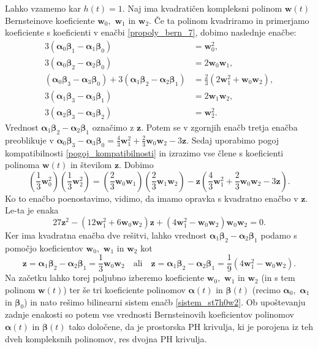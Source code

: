 \documentclass[12pt,a4paper,twoside]{article}
\theoremstyle{definition} %
\theoremstyle{plain} %
\numberwithin{equation}{section}  %
\newcommand{\wV}{\mathbf{w}}
\newcommand{\zV}{\mathbf{z}}
\newcommand{\balpha}{\boldsymbol \alpha}
\newcommand{\bbeta}{\boldsymbol \beta}
\begin{document}
Lahko vzamemo kar $h(t)=1.$ Naj ima kvadratičen kompleksni polinom $\wV(t)$ Bernsteinove koeficiente $\wV_0,$ $\wV_1$ in $\wV_2.$ Če ta polinom kvadriramo in primerjamo koeficiente s koeficienti v enačbi \eqref{propoly_bern_7}, dobimo naslednje enačbe:
\begin{align}
	3(\balpha_0\bbeta_1-\balpha_1\bbeta_0)&=\wV_0^2,\nonumber\\
	3(\balpha_0\bbeta_2-\balpha_2\bbeta_0)&=2\wV_0\wV_1,\nonumber\\
	(\balpha_0\bbeta_3-\balpha_3\bbeta_0)+3(\balpha_1\bbeta_2-\balpha_2\bbeta_1)&=\frac{2}{3}(2\wV_1^2+\wV_0\wV_2),\nonumber\\
	3(\balpha_1\bbeta_3-\balpha_3\bbeta_1)&=2\wV_1\wV_2,\nonumber\\
	3(\balpha_2\bbeta_3-\balpha_3\bbeta_2)&=\wV_2^2.\label{sistem_st7h0w2}
\end{align}
Vrednost $\balpha_1\bbeta_2-\balpha_2\bbeta_1$ označimo z $\zV.$ Potem se v zgornjih enačb tretja enačba preoblikuje v $\balpha_0\bbeta_3-\balpha_3\bbeta_0=\frac{4}{3}\wV_1^2+\frac{2}{3}\wV_0\wV_2-3\zV.$ Sedaj uporabimo pogoj kompatibilnosti \eqref{pogoj_kompatibilnosti} in izrazimo vse člene s koeficienti polinoma $\wV(t)$ in številom $\zV.$ Dobimo
\begin{equation*}
	\left(\frac{1}{3}\wV_0^2\right)\left(\frac{1}{3}\wV_2^2\right)=\left(\frac{2}{3}\wV_0\wV_1\right)\left(\frac{2}{3}\wV_1\wV_2\right)-\zV\left(\frac{4}{3}\wV_1^2+\frac{2}{3}\wV_0\wV_2-3\zV\right).
\end{equation*}
Ko to enačbo poenostavimo, vidimo, da imamo opravka s kvadratno enačbo v $\zV.$ Le-ta je enaka
\begin{equation*}
	27\zV^2-(12\wV_1^2+6\wV_0\wV_2)\zV+(4\wV_1^2-\wV_0\wV_2)\wV_0\wV_2=0.
\end{equation*}
Ker ima kvadratna enačba dve rešitvi, lahko vrednost $\balpha_1\bbeta_2-\balpha_2\bbeta_1$ podamo s pomočjo koeficientov $\wV_0,$ $\wV_1$ in $\wV_2$ kot
\begin{equation}
	\label{st7h0w2}
	\zV=\balpha_1\bbeta_2-\balpha_2\bbeta_1=\frac{1}{3}\wV_0\wV_2\quad\text{ali}\quad\zV=\balpha_1\bbeta_2-\balpha_2\bbeta_1=\frac{1}{9}(4\wV_1^2-\wV_0\wV_2).
\end{equation}
Na začetku lahko torej poljubno izberemo koeficiente $\wV_0,$ $\wV_1$ in $\wV_2$ (in s tem polinom $\wV(t)$) ter še tri koeficiente polinomov $\balpha(t)$ in $\bbeta(t)$ (recimo $\balpha_0,$ $\balpha_1$ in $\bbeta_0$) in nato rešimo bilinearni sistem enačb \eqref{sistem_st7h0w2}. Ob upoštevanju zadnje enakosti so potem vse vrednosti Bernsteinovih koeficientov polinomov $\balpha(t)$ in $\bbeta(t)$ tako določene, da je prostorska PH krivulja, ki je porojena iz teh dveh kompleksnih polinomov, res dvojna PH krivulja.
\end{document}

